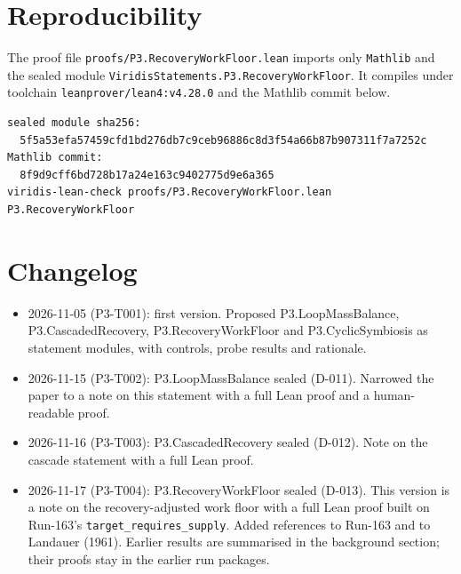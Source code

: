 \documentclass[11pt]{article}
\theoremstyle{definition}
\theoremstyle{remark}
\begin{document}
\section{Reproducibility}
\sloppy
The proof file \texttt{proofs/P3.RecoveryWorkFloor.lean} imports only \texttt{Mathlib} and the
sealed module \texttt{ViridisStatements.P3.RecoveryWorkFloor}. It compiles under toolchain
\texttt{leanprover/lean4:v4.28.0} and the Mathlib commit below.
\begin{lstlisting}[language={},frame=none]
sealed module sha256:
  5f5a53efa57459cfd1bd276db7c9ceb96886c8d3f54a66b87b907311f7a7252c
Mathlib commit:
  8f9d9cff6bd728b17a24e163c9402775d9e6a365
viridis-lean-check proofs/P3.RecoveryWorkFloor.lean P3.RecoveryWorkFloor
\end{lstlisting}

\section{Changelog}
\begin{itemize}
\item 2026-11-05 (P3-T001): first version. Proposed P3.LoopMassBalance, P3.CascadedRecovery,
P3.RecoveryWorkFloor and P3.CyclicSymbiosis as statement modules, with controls, probe results
and rationale.
\item 2026-11-15 (P3-T002): P3.LoopMassBalance sealed (D-011). Narrowed the paper to a note on
this statement with a full Lean proof and a human-readable proof.
\item 2026-11-16 (P3-T003): P3.CascadedRecovery sealed (D-012). Note on the cascade statement with
a full Lean proof.
\item 2026-11-17 (P3-T004): P3.RecoveryWorkFloor sealed (D-013). This version is a note on the
recovery-adjusted work floor with a full Lean proof built on Run-163's
\texttt{target\_requires\_supply}. Added references to Run-163 and to Landauer (1961). Earlier
results are summarised in the background section; their proofs stay in the earlier run packages.
\end{itemize}



\end{document}
